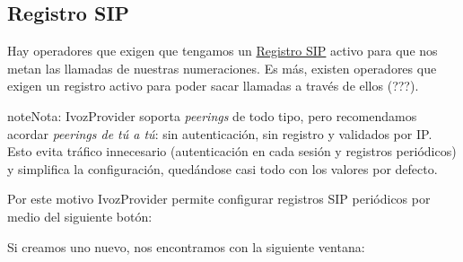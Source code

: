 \documentclass[letterpaper,10pt,spanish]{sphinxmanual}
\begin{document}
\subsection{Registro SIP}
\label{external_incoming_calls/peering_contracts:registro-sip}
Hay operadores que exigen que tengamos un \href{https://tools.ietf.org/html/rfc3261\#section-10}{Registro SIP} activo para que nos metan las llamadas de nuestras numeraciones. Es más, existen operadores que exigen un registro activo para poder sacar llamadas a través de ellos (???).

\begin{notice}{note}{Nota:}
IvozProvider soporta \emph{peerings} de todo tipo, pero recomendamos acordar \emph{peerings de tú a tú}: sin autenticación, sin registro y validados por IP. Esto evita tráfico innecesario (autenticación en cada sesión y registros periódicos) y simplifica la configuración, quedándose casi todo con los valores por defecto.
\end{notice}

Por este motivo IvozProvider permite configurar registros SIP periódicos por medio del siguiente botón:

\noindent{}

Si creamos uno nuevo, nos encontramos con la siguiente ventana:
\end{document}
